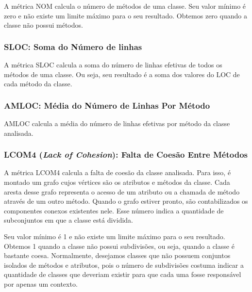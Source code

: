 A métrica NOM calcula o número de métodos de uma classe. Seu valor mínimo é zero e não existe um limite máximo para o seu resultado. Obtemos zero quando a classe não possui métodos.                                                                   
                           
                                                        
\subsubsection{SLOC: Soma do Número de linhas}
                                          
A métrica SLOC calcula a soma do número de linhas efetivas de todos os métodos de uma classe. Ou seja, seu resultado é a soma dos valores do LOC de cada método da classe.


\subsubsection{AMLOC: Média do Número de Linhas Por Método}
                                   
AMLOC calcula a média do número de linhas efetivas por método da classe analisada.
	

\subsubsection{LCOM4 (\textit{Lack of Cohesion}): Falta de Coesão Entre Métodos}

A métrica LCOM4 \citep{HM96} calcula a falta de coesão da classe analisada. Para isso, é montado um grafo cujos vértices são os atributos e métodos da classe. Cada aresta desse grafo representa o acesso de um atributo ou a chamada de método através de um outro método. Quando o grafo estiver pronto, são contabilizados os componentes conexos existentes nele. Esse número indica a quantidade de subconjuntos em que a classe está dividida.

Seu valor mínimo é 1 e não existe um limite máximo para o seu resultado. Obtemos 1 quando a classe não possui subdivisões, ou seja, quando a classe é bastante coesa. Normalmente, desejamos classes que não possuem conjuntos isolados de métodos e atributos, pois o número de subdivisões costuma indicar a quantidade de classes que deveriam existir para que cada uma fosse responsável por apenas um contexto.
                                                    
	  

